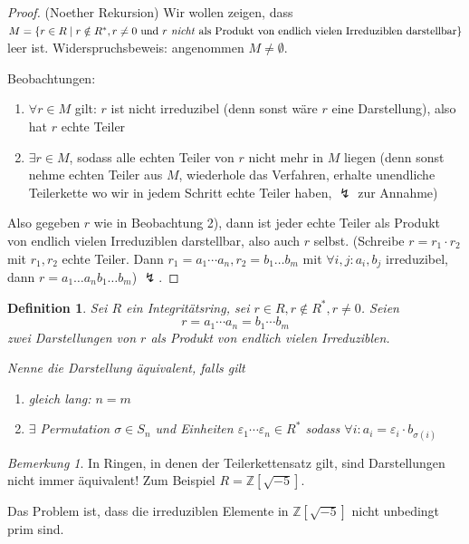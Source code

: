 \documentclass[a4paper,12pt,numbers=noenddot,parskip=full]{scrartcl}
\newcommand{\setZ}{\mathbb{Z}}
\theoremstyle{dotless}
\newtheorem{definition}[theorem]{Definition}
\theoremstyle{remark}
\newtheorem*{remark}{Bemerkung}
\begin{document}
 	\begin{proof}(Noether Rekursion)
 		Wir wollen zeigen, dass $M = \{ r \in R \mid r \notin R^*, r \neq 0 \text{ und $r$ \emph{nicht} als Produkt von endlich vielen Irreduziblen darstellbar} \}$ leer ist. Widerspruchsbeweis: angenommen $M \neq \emptyset$.
 		
 		Beobachtungen:
 		\begin{enumerate}
 			\item $\forall r \in M$ gilt: $r$ ist nicht irreduzibel (denn sonst wäre $r$ eine Darstellung), also hat $r$ echte Teiler
 			\item $\exists r \in M$, sodass alle echten Teiler von $r$ nicht mehr in $M$ liegen (denn sonst nehme echten Teiler aus $M$, wiederhole das Verfahren, erhalte unendliche Teilerkette wo wir in jedem Schritt echte Teiler haben, $\lightning$ zur Annahme)
 		\end{enumerate}
 	
 		Also gegeben $r$ wie in Beobachtung 2), dann ist jeder echte Teiler als Produkt von endlich vielen Irreduziblen darstellbar, also auch $r$ selbst. (Schreibe $r = r_1 \cdot r_2$ mit $r_1, r_2$ echte Teiler. Dann $r_1 = a_1 \cdots a_n, r_2 = b_1 \dots b_m$ mit $\forall i,j : a_i, b_j$ irreduzibel, dann $r = a_1 \dots a_n b_1 \dots b_m$) $\lightning$.
 	\end{proof}
 
 	\begin{definition}
 		Sei $R$ ein Integritätsring, sei $r \in R, r \notin R^*, r \neq 0$. Seien
 		\begin{equation*}
	 		r = a_1 \cdots a_n = b_1 \cdots b_m
 		\end{equation*}
 		zwei Darstellungen von $r$ als Produkt von endlich vielen Irreduziblen.
 		
 		Nenne die Darstellung äquivalent, falls gilt
 		\begin{enumerate}
 			\item gleich lang: $n = m$
 			\item $\exists$ Permutation $\sigma \in S_n$ und Einheiten $\varepsilon_1 \cdots \varepsilon_n \in R^*$ sodass $\forall i: a_i = \varepsilon_i \cdot b_{\sigma(i)}$
 		\end{enumerate}
 	\end{definition}
 
 	\begin{remark}
 		In Ringen, in denen der Teilerkettensatz gilt, sind Darstellungen nicht immer äquivalent! Zum Beispiel $R = \setZ[{\sqrt{-5}}]$.
 		
 		Das Problem ist, dass die irreduziblen Elemente in $\setZ[\sqrt{-5}]$ nicht unbedingt prim sind.
 	\end{remark}
\end{document}
